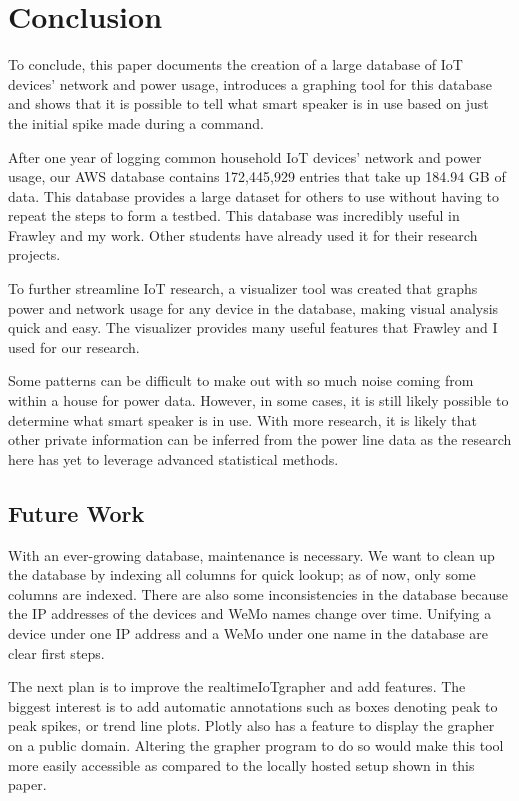 \chapter{Conclusion}
\label{Conclusion}
To conclude, this paper documents the creation of a large database of IoT devices' network and power usage, introduces a graphing tool for this database and shows that it is possible to tell what smart speaker is in use based on just the initial spike made during a command.

After one year of logging common household IoT devices' network and power usage, our AWS database contains 172,445,929 entries that take up 184.94 GB of data. This database provides a large dataset for others to use without having to repeat the steps to form a testbed. This database was incredibly useful in Frawley and my work. Other students have already used it for their research projects.

To further streamline IoT research, a visualizer tool was created that graphs power and network usage for any device in the database, making visual analysis quick and easy. The visualizer provides many useful features that Frawley and I used for our research.

Some patterns can be difficult to make out with so much noise coming from within a house for power data. However, in some cases, it is still likely possible to determine what smart speaker is in use. With more research, it is likely that other private information can be inferred from the power line data as the research here has yet to leverage advanced statistical methods.

\section{Future Work}
With an ever-growing database, maintenance is necessary. We want to clean up the database by indexing all columns for quick lookup; as of now, only some columns are indexed. There are also some inconsistencies in the database because the IP addresses of the devices and WeMo names change over time. Unifying a device under one IP address and a WeMo under one name in the database are clear first steps.

The next plan is to improve the realtimeIoTgrapher and add features. The biggest interest is to add automatic annotations such as boxes denoting peak to peak spikes, or trend line plots. Plotly also has a feature to display the grapher on a public domain. Altering the grapher program to do so would make this tool more easily accessible as compared to the locally hosted setup shown in this paper.

